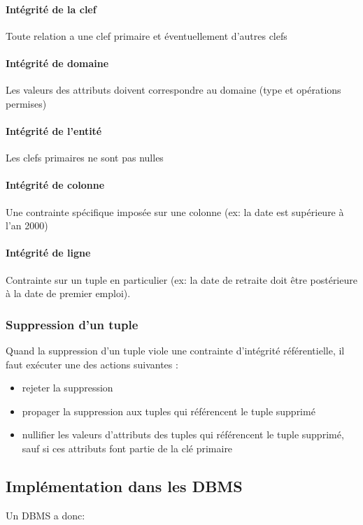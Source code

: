 \documentclass[a4paper]{article}
\begin{document}
\paragraph{Intégrité de la clef}
Toute relation a une clef primaire et éventuellement d'autres clefs

\paragraph{Intégrité de domaine}
Les valeurs des attributs doivent correspondre au domaine (type et opérations permises)

\paragraph{Intégrité de l'entité}
Les clefs primaires ne sont pas nulles

\paragraph{Intégrité de colonne}
Une contrainte spécifique imposée sur une colonne (ex: la date est supérieure à l'an 2000)

\paragraph{Intégrité de ligne}
Contrainte sur un tuple en particulier (ex: la date de retraite doit être postérieure
à la date de premier emploi).

\subsubsection{Suppression d'un tuple}
Quand la suppression d'un tuple viole une contrainte d'intégrité référentielle,
il faut exécuter une des actions suivantes :
\begin{itemize}
  \item rejeter la suppression
  \item propager la suppression aux tuples qui référencent le tuple supprimé
  \item nullifier les valeurs d'attributs des tuples qui référencent le tuple supprimé,
  sauf si ces attributs font partie de la clé primaire
\end{itemize}

\subsection{Implémentation dans les DBMS}
Un DBMS a donc:
\end{document}

